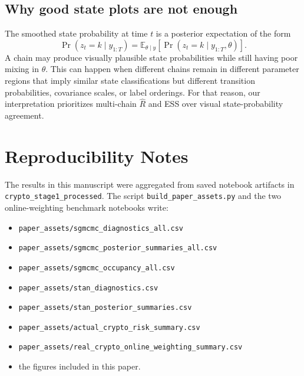 \documentclass{article}
\newcommand{\E}{\mathbb{E}}
\newcommand{\1}{\mathbf{1}}
\begin{document}
\subsection{Why good state plots are not enough}

The smoothed state probability at time $t$ is a posterior expectation of the form
\[
  \Pr(z_t=k\mid y_{1:T})
  =
  \E_{\theta\mid y}
  \left[
  \Pr(z_t=k\mid y_{1:T},\theta)
  \right].
\]
A chain may produce visually plausible state probabilities while still having poor mixing in $\theta$. This can happen when different chains remain in different parameter regions that imply similar state classifications but different transition probabilities, covariance scales, or label orderings. For that reason, our interpretation prioritizes multi-chain $\hat R$ and ESS over visual state-probability agreement.

\section{Reproducibility Notes}

The results in this manuscript were aggregated from saved notebook artifacts in \texttt{crypto\_stage1\_processed}. The script \texttt{build\_paper\_assets.py} and the two online-weighting benchmark notebooks write:
\begin{itemize}
  \item \texttt{paper\_assets/sgmcmc\_diagnostics\_all.csv}
  \item \texttt{paper\_assets/sgmcmc\_posterior\_summaries\_all.csv}
  \item \texttt{paper\_assets/sgmcmc\_occupancy\_all.csv}
  \item \texttt{paper\_assets/stan\_diagnostics.csv}
  \item \texttt{paper\_assets/stan\_posterior\_summaries.csv}
  \item \texttt{paper\_assets/actual\_crypto\_risk\_summary.csv}
  \item \texttt{paper\_assets/real\_crypto\_online\_weighting\_summary.csv}
  \item the figures included in this paper.
\end{itemize}



\end{document}
